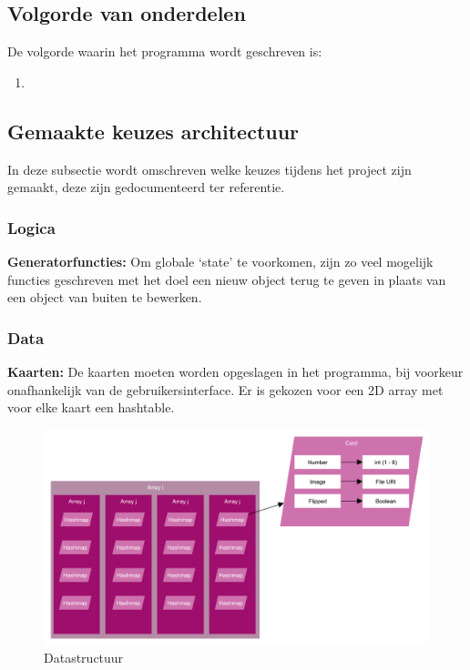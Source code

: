 \documentclass[a4paper,titlepage,11pt]{article}
\begin{document}
\subsection{Volgorde van onderdelen}

De volgorde waarin het programma wordt geschreven is:
\begin{enumerate}
\item 
\end{enumerate}

\subsection{Gemaakte keuzes architectuur}

In deze subsectie wordt omschreven welke keuzes tijdens het project zijn gemaakt,
deze zijn gedocumenteerd ter referentie.

\subsubsection{Logica}

{\bf Generatorfuncties:}
Om globale `state' te voorkomen, zijn zo veel mogelijk functies geschreven met
het doel een nieuw object terug te geven in plaats van een object van buiten te bewerken.

\subsubsection{Data}

{\bf Kaarten:}
De kaarten moeten worden opgeslagen in het programma,
bij voorkeur onafhankelijk van de gebruikersinterface.
Er is gekozen voor een 2D array met voor elke kaart een hashtable.


\begin{figure}[!hb]
  \includegraphics[width=\linewidth]{../Images/datastructure.pdf}
  \caption{Datastructuur}\label{fig:datastructure}
\end{figure}
\end{document}
